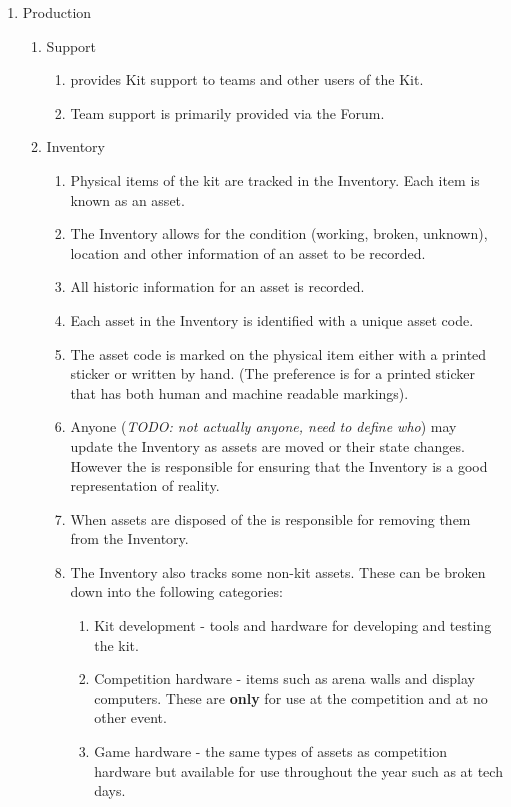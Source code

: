 \begin{draft}
\begin{enumerate}
\item Production
  \begin{enumerate}
  \item Support
    \begin{enumerate}
      \item {} provides Kit support to teams and other users of the Kit.
      \item Team support is primarily provided via the Forum.
    \end{enumerate}
  \item Inventory
    \begin{enumerate}
      \item Physical items of the kit are tracked in the Inventory. Each item is known as an asset.
      \item The Inventory allows for the condition (working, broken, unknown), location and other information of an asset to be recorded.
      \item All historic information for an asset is recorded.
      \item Each asset in the Inventory is identified with a unique asset code.
      \item The asset code is marked on the physical item either with a printed sticker or written by hand. (The preference is for a printed sticker that has both human and machine readable markings).
      \item Anyone (\emph{TODO: not actually anyone, need to define who}) may update the Inventory as assets are moved or their state changes. However the  is responsible for ensuring that the Inventory is a good representation of reality.
      \item When assets are disposed of the  is responsible for removing them from the Inventory.
      \item The Inventory also tracks some non-kit assets. These can be broken down into the following categories:
        \begin{enumerate}
          \item Kit development - tools and hardware for developing and testing the kit.
          \item Competition hardware - items such as arena walls and display computers. These are \textbf{only} for use at the competition and at no other event.
          \item Game hardware - the same types of assets as competition hardware but available for use throughout the year such as at tech days.

\end{enumerate}
\end{enumerate}
\end{enumerate}
\end{enumerate}
\end{draft}
